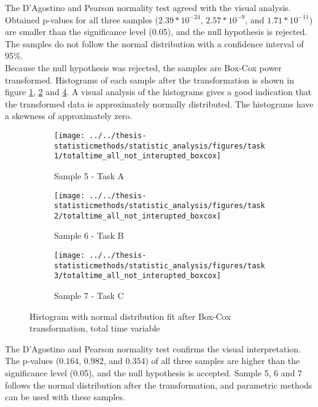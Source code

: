 The D'Agostino and Pearson normality test agreed with the visual analysis. Obtained p-values for all three samples ($2.39 * 10^{-24}$, $2.57 * 10^{-9}$, and $1.71 * 10^{-11}$) are smaller than the significance level (0.05), and the null hypothesis is rejected. The samples do not follow the normal distribution with a confidence interval of 95\%.\\[0.2cm]

Because the null hypothesis was rejected, the samples are Box-Cox power transformed. Histograms of each sample after the transformation is shown in figure \ref{fig:totaltimeallnotinteruptedboxcox_task1}, \ref{fig:totaltimeallnotinteruptedboxcox_task2} and \ref{fig:totaltimeallnotinteruptedboxcox_task3}. A visual analysis of the histograms gives a good indication that the transformed data is approximately normally distributed. The histograms have a skewness of approximately zero. 

\begin{figure}[H]
	\centering
	\begin{subfigure}[b]{0.32\textwidth}
		\centering
		\texttt{[image: ../../thesis-statisticmethods/statistic\_analysis/figures/task1/totaltime\_all\_not\_interupted\_boxcox]}
		\caption{Sample 5 - Task A}
		\label{fig:totaltimeallnotinteruptedboxcox_task1}
	\end{subfigure}
	\begin{subfigure}[b]{0.32\textwidth}
		\centering
		\texttt{[image: ../../thesis-statisticmethods/statistic\_analysis/figures/task2/totaltime\_all\_not\_interupted\_boxcox]}
		\caption{Sample 6 - Task B}
		\label{fig:totaltimeallnotinteruptedboxcox_task2}
	\end{subfigure}
	\begin{subfigure}[b]{0.32\textwidth}
		\centering
		\texttt{[image: ../../thesis-statisticmethods/statistic\_analysis/figures/task3/totaltime\_all\_not\_interupted\_boxcox]}
		\caption{Sample 7 - Task C}
		\label{fig:totaltimeallnotinteruptedboxcox_task3}
	\end{subfigure}
	\caption{Histogram with normal distribution fit after Box-Cox transformation, total time variable}
\end{figure}

The D'Agostino and Pearson normality test confirms the visual interpretation. The p-values ($0.164$, $0.982$, and $0.354$) of all three samples are higher than the significance level (0.05), and the null hypothesis is accepted. Sample 5, 6 and 7 follows the normal distribution after the transformation, and parametric methods can be used with these samples.
 
